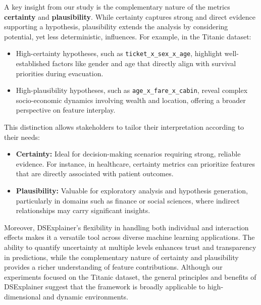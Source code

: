 \documentclass[acmlarge]{acmart}
\begin{document}
A key insight from our study is the complementary nature of the metrics \textbf{certainty} and \textbf{plausibility}. While certainty captures strong and direct evidence supporting a hypothesis, plausibility extends the analysis by considering potential, yet less deterministic, influences. For example, in the Titanic dataset:
\begin{itemize}
    \item High-certainty hypotheses, such as \texttt{ticket\_x\_sex\_x\_age}, highlight well-established factors like gender and age that directly align with survival priorities during evacuation.

    \item High-plausibility hypotheses, such as \texttt{age\_x\_fare\_x\_cabin}, reveal complex socio-economic dynamics involving wealth and location, offering a broader perspective on feature interplay.
\end{itemize}

This distinction allows stakeholders to tailor their interpretation according to their needs:
\begin{itemize}
    \item \textbf{Certainty:} Ideal for decision-making scenarios requiring strong, reliable evidence. For instance, in healthcare, certainty metrics can prioritize features that are directly associated with patient outcomes.
    \item \textbf{Plausibility:} Valuable for exploratory analysis and hypothesis generation, particularly in domains such as finance or social sciences, where indirect relationships may carry significant insights.
\end{itemize}


Moreover, DSExplainer’s flexibility in handling both individual and interaction effects makes it a versatile tool across diverse machine learning applications. The ability to quantify uncertainty at multiple levels enhances trust and transparency in predictions, while the complementary nature of certainty and plausibility provides a richer understanding of feature contributions. Although our experiments focused on the Titanic dataset, the general principles and benefits of DSExplainer suggest that the framework is broadly applicable to high-dimensional and dynamic environments.
\end{document}
